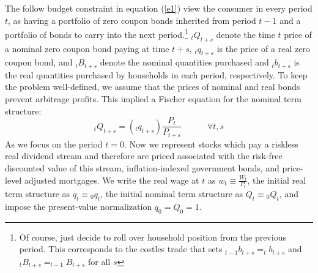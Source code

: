 \documentclass[11pt,letterpaper]{article}
\begin{document}
The follow budget constraint in equation (\ref{e1}) view the consumer in every period $t$, as having a portfolio of zero coupon bonds inherited from period $t-1$ and a portfolio of bonds to carry into the next period.\footnote{Of course, just decide to roll over household position from the previous period. This corresponds to the costles trade that sets $_{t-1}b_{t+s} = _{t}b_{t+s}$ and $_{t}B_{t+s} = _{t-1}B_{t+s}$ for all $s$} $_tQ_{t+s}$ denote the time $t$ price of a nominal zero coupon bond paying at time $t+s$, $_{t}q_{t+s}$ is the price of a real zero coupon bond, and $_{t}B_{t+s}$ denote the nominal quantities purchased and $_{t}b_{t+s}$ is the real quantities purchased by households in each period, respectively. To keep the problem well-defined, we assume that the prices of nominal and real bonds prevent arbitrage profits. This implied a Fischer equation for the nominal term structure: 
\begin{equation*}
	_{t}Q_{t+s} = (_{t}q_{t+s}) \frac{P_{t}}{P_{t+s}} \quad \quad \quad \forall t,s
\end{equation*}
As we focus on the period $t=0$. Now we represent stocks which pay a riskless real dividend stream and therefore are priced associated with the risk-free discounted value of this stream, inflation-indexed government bonds, and price-level adjusted mortgages. We write the real wage at $t$ as $w_{t} \equiv \frac{W_{t}}{P_{t}}$, the initial real term structure as $q_{t} \equiv {_{0}q_{t}}$, the initial nominal term structure as $Q_{t} \equiv {_{0}Q_{t}}$, and impose the present-value normalization $q_{0} = Q_{0} =1$.
\end{document}
